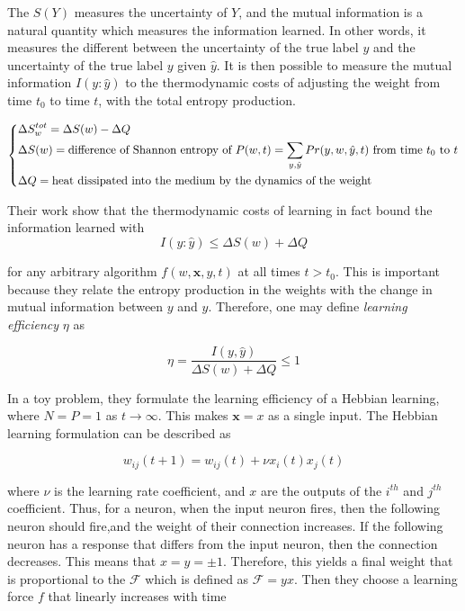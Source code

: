 The $S(Y)$ measures the uncertainty of $Y$, and the mutual information is a natural quantity which measures the information learned. In other words, it measures the different between the uncertainty of the true label $y$ and the uncertainty of the true label $y$ given $\hat{y}$. It is then possible to measure the mutual information $I(y:\hat{y})$ to the thermodynamic costs of adjusting the weight from time $t_0$ to time $t$, with the total entropy production.

\begin{equation*}
    \begin{dcases}
        \Delta S_w^{tot} = \Delta S(w) - \Delta Q  \\
        \Delta S(w) = \text{difference of Shannon entropy of } P(w,t) = \sum_{y,\hat{y}} Pr(y,w,\hat{y},t)\text{ from time $t_0$ to $t$} \\
        \Delta Q = \text{heat dissipated into the medium by the dynamics of the weight}
    \end{dcases}
\end{equation*}

Their work show that the thermodynamic costs of learning in fact bound the information learned with
$$I(y:\hat{y}) \leq \Delta S(w) + \Delta Q$$

for any arbitrary algorithm $f(w,\bm{x},y,t)$ at all times $t > t_0$. This is important because they relate the entropy production in the weights with the change in mutual information between $y$ and $\hat{y}$. Therefore, one may define \textit{learning efficiency} $\eta$ as

$$ \eta = \frac{I(y,\hat{y})}{\Delta S(w) + \Delta Q} \leq 1$$

In a toy problem, they formulate the learning efficiency of a Hebbian learning, where $N=P=1$ as $t\rightarrow \infty$. This makes $\bm{x} = x$ as a single input. The Hebbian learning formulation can be described as

$$w_{ij}(t+1) = w_{ij}(t) + \nu x_i(t) x_j(t)$$

where $\nu$ is the learning rate coefficient, and $x$ are the outputs of the $i^{th}$ and $j^{th}$ coefficient. Thus, for a neuron, when the input neuron fires, then the following neuron should fire,and the weight of their connection increases. If the following neuron has a response that differs from the input neuron, then the connection decreases. This means that $x = y = \pm 1$. Therefore, this yields a final weight that is proportional to the $\mathcal{F}$ which is defined as $\mathcal{F} = y x$. Then they choose a learning force $f$ that linearly increases with time

